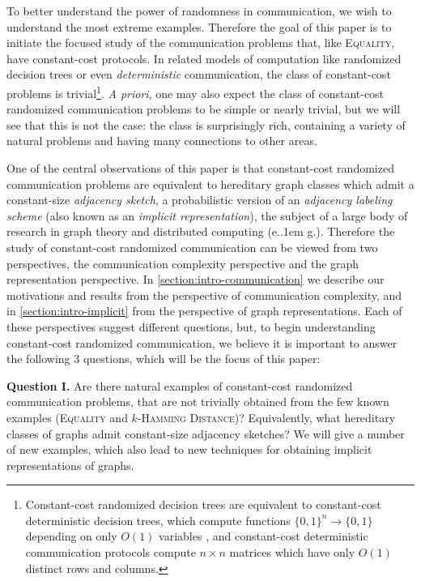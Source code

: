 \documentclass{theoretics}
\makeatletter
\newcommand{\zo}{\{0,1\}}
\newcommand*\eg{e.\kern.1em g.\@\xspace} %
\makeatother
\begin{document}
To better understand the power of randomness in communication, we wish to understand the most
extreme examples. Therefore the goal of this paper is to initiate the focused study of the
communication problems that, like \textsc{Equality}, have constant-cost protocols. In related models
of computation like randomized decision trees or even \emph{deterministic} communication, the class
of constant-cost problems is trivial\footnote{Constant-cost randomized decision trees are equivalent
to constant-cost deterministic decision trees, which compute functions $\zo^n \to \zo$ depending on
only $O(1)$ variables \cite{BdW02}, and constant-cost deterministic communication protocols compute
$n \times n$ matrices which have only $O(1)$ distinct rows and columns.}. \emph{A priori}, one may
also expect the class of constant-cost randomized communication problems to be simple or nearly
trivial, but we will see that this is not the case: the class is surprisingly rich, containing a
variety of natural problems and having many connections to other areas.

One of the central observations of this paper is that constant-cost randomized communication
problems are equivalent to hereditary graph classes which admit a constant-size \emph{adjacency sketch}, a
probabilistic version of an \emph{adjacency labeling scheme} (also known as an \emph{implicit
representation}), the subject of a large body of research in graph theory and distributed computing
(\eg \cite{KNR92,FK09,KM12,ACLZ15,Har20,BGK+21a,DEG+21,HH22}). Therefore the study of constant-cost
randomized communication can be viewed from two perspectives, the communication complexity perspective and the
graph representation perspective. In \cref{section:intro-communication} we describe our motivations
and results from the perspective of communication complexity, and in \cref{section:intro-implicit}
from the perspective of graph representations. Each of these perspectives suggest different
questions, but, to begin understanding constant-cost randomized communication, we believe it is
important to answer the following 3 questions, which will be the focus of this paper:

\vspace{0.75em}\noindent\textbf{Question I.}
Are there natural examples of constant-cost randomized communication problems, that are not
trivially obtained from the few known examples (\textsc{Equality} and $k$-\textsc{Hamming
Distance})?  Equivalently, what hereditary classes of graphs admit constant-size adjacency sketches?
We will give a number of new examples, which also lead to new 
techniques for obtaining implicit representations of graphs.
\end{document}
